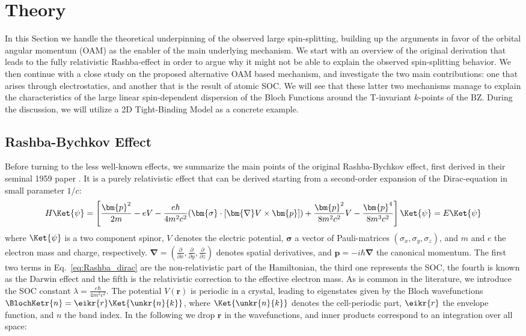 \section{Theory \label{sec:Rashba_Theory}}
In this Section we handle the theoretical underpinning of the observed large spin-splitting, building up the arguments in favor of the orbital angular momentum (OAM) as the enabler of the main underlying mechanism.
We start with an overview of the original derivation that leads to the fully relativistic Rashba-effect in order to argue why it might not be able to explain the observed spin-splitting behavior.
We then continue with a close study on the proposed alternative OAM based mechanism, and investigate the two main contributions: one that arises through electrostatics, and another that is the result of atomic SOC.
We will see that these latter two mechanisms manage to explain the characteristics of the large linear spin-dependent dispersion of the Bloch Functions around the T-invariant $k$-points of the BZ.
During the discussion, we will utilize a 2D Tight-Binding Model as a concrete example.

\subsection{Rashba-Bychkov Effect \label{sec:Rashba_relativistic}}
Before turning to the less well-known effects, we summarize the main points of the original Rashba-Bychkov effect, first derived in their seminal 1959 paper \cite{Rashba1959SymmetryAr}.
It is a purely relativistic effect that can be derived starting from a second-order expansion of the Dirac-equation in small parameter $1/c$:
\begin{equation}
	\label{eq:Rashba_dirac}
	H \Ket{\psi} = \left[\frac{\bm{p}^2}{2m} - e V - \frac{e \hbar}{4m^2c^2}(\bm{\sigma}\cdot[\bm{\nabla}V \times \bm{p}]) + \frac{\bm{p}^2}{8m^2c^2} V - \frac{\bm{p}^4}{8m^3c^2}\right]\Ket{\psi} = E\Ket{\psi}
\end{equation}
where $\Ket{\psi}$ is a two component spinor, $V$ denotes the electric potential, $\bm{\sigma}$ a vector of Pauli-matrices $(\sigma_x, \sigma_y, \sigma_z)$, and $m$ and $e$ the electron mass and charge, respectively.
$\bm \nabla = (\frac{\partial}{\partial x}, \frac{\partial}{\partial y}, \frac{\partial }{\partial z})$ denotes spatial derivatives, and $\bm{p} = -i\hbar \bm{\nabla}$ the canonical momentum.
The first two terms in Eq.~\eqref{eq:Rashba_dirac} are the non-relativistic part of the Hamiltonian, the third one represents the SOC, the fourth is known as the Darwin effect and the fifth is the relativistic correction to the effective electron mass. 
As is common in the literature, we introduce the SOC constant $\lambda = \frac{e \hbar}{4m^2c^2}$.
The potential $V(\bm r)$ is periodic in a crystal, leading to eigenstates given by the Bloch wavefunctions $\BlochKetr{n} = \eikr{r} \Ket{\unkr{n}{k}}$, where $\Ket{\unkr{n}{k}}$ denotes the cell-periodic part, $\eikr{r}$ the envelope function, and $n$ the band index.
In the following we drop $\bm{r}$ in the wavefunctions, and inner products correspond to an integration over all space:

